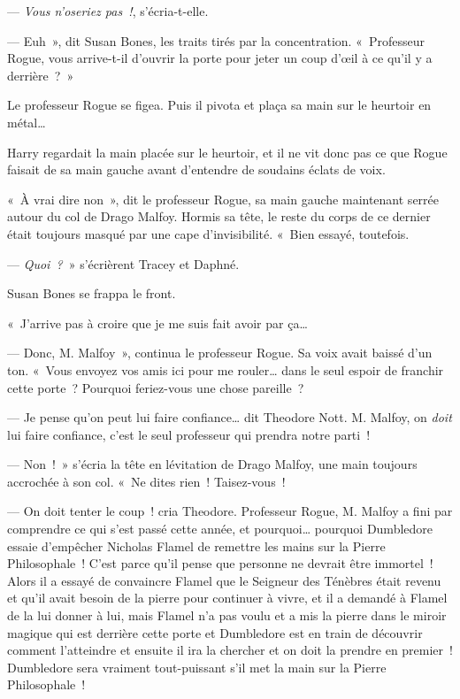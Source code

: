--- \emph{Vous n'oseriez pas~!}, s'écria-t-elle.

--- Euh~», dit Susan Bones, les traits tirés par la concentration. «~Professeur Rogue, vous arrive-t-il d'ouvrir la porte pour jeter un coup d'œil à ce qu'il y a derrière~?~»

Le professeur Rogue se figea. Puis il pivota et plaça sa main sur le heurtoir en métal…

Harry regardait la main placée sur le heurtoir, et il ne vit donc pas ce que Rogue faisait de sa main gauche avant d'entendre de soudains éclats de voix.

«~À vrai dire non~», dit le professeur Rogue, sa main gauche maintenant serrée autour du col de Drago Malfoy. Hormis sa tête, le reste du corps de ce dernier était toujours masqué par une cape d'invisibilité. «~Bien essayé, toutefois.

--- \emph{Quoi~?}~» s'écrièrent Tracey et Daphné.

Susan Bones se frappa le front.

«~J'arrive pas à croire que je me suis fait avoir par ça…

--- Donc, M. Malfoy~», continua le professeur Rogue. Sa voix avait baissé d'un ton. «~Vous envoyez vos amis ici pour me rouler… dans le seul espoir de franchir cette porte~? Pourquoi feriez-vous une chose pareille~?

--- Je pense qu'on peut lui faire confiance… dit Theodore Nott. M. Malfoy, on \emph{doit} lui faire confiance, c'est le seul professeur qui prendra notre parti~!

--- Non~!~» s'écria la tête en lévitation de Drago Malfoy, une main toujours accrochée à son col. «~Ne dites rien~! Taisez-vous~!

--- On doit tenter le coup~! cria Theodore. Professeur Rogue, M. Malfoy a fini par comprendre ce qui s'est passé cette année, et pourquoi… pourquoi Dumbledore essaie d'empêcher Nicholas Flamel de remettre les mains sur la Pierre Philosophale~! C'est parce qu'il pense que personne ne devrait être immortel~! Alors il a essayé de convaincre Flamel que le Seigneur des Ténèbres était revenu et qu'il avait besoin de la pierre pour continuer à vivre, et il a demandé à Flamel de la lui donner à lui, mais Flamel n'a pas voulu et a mis la pierre dans le miroir magique qui est derrière cette porte et Dumbledore est en train de découvrir comment l'atteindre et ensuite il ira la chercher et on doit la prendre en premier~! Dumbledore sera vraiment tout-puissant s'il met la main sur la Pierre Philosophale~!

